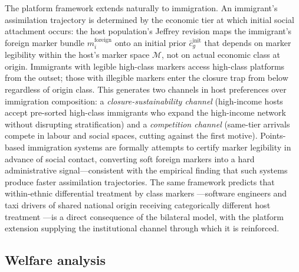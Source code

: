 \documentclass[12pt,a4paper]{article}
\theoremstyle{definition}
\numberwithin{proposition}{subsection}
\newcommand{\M}{\mathcal{M}}
\begin{document}
The platform framework extends naturally to immigration. An
immigrant's assimilation trajectory is determined by the economic
tier at which initial social attachment occurs: the host population's
Jeffrey revision maps the immigrant's foreign marker bundle
$m_i^{\text{foreign}}$ onto an initial prior
$\bar{c}_g^{\text{init}}$ that depends on marker legibility within
the host's marker space $\M$, not on actual economic class at origin.
Immigrants with legible high-class markers access high-class
platforms from the outset; those with illegible markers enter the
closure trap from below regardless of origin class. This generates
two channels in host preferences over immigration composition: a
\emph{closure-sustainability channel} (high-income hosts accept
pre-sorted high-class immigrants who expand the high-income network
without disrupting stratification) and a \emph{competition channel}
(same-tier arrivals compete in labour and social spaces, cutting
against the first motive). Points-based immigration systems are
formally attempts to certify marker legibility in advance of social
contact, converting soft foreign markers into a hard administrative
signal---consistent with the empirical finding that such systems
produce faster assimilation trajectories. The same framework
predicts that within-ethnic differential treatment by class markers
---software engineers and taxi drivers of shared national origin
receiving categorically different host treatment
\citep{LeeZhou2015, Waters1999}---is a direct consequence of the
bilateral model, with the platform extension supplying the
institutional channel through which it is reinforced.

\subsection{Welfare analysis}
\label{subsec:welfare}
\end{document}
